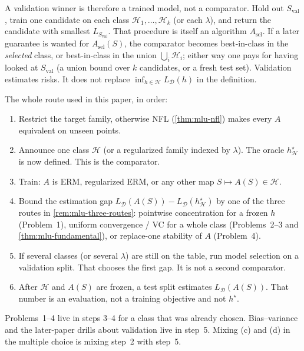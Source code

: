 \begin{remark}
A validation winner is therefore a trained model, not a comparator. Hold out $S_{\mathrm{val}}$, train one candidate on each class $\mathcal{H}_1,\dots,\mathcal{H}_k$ (or each $\lambda$), and return the candidate with smallest $L_{S_{\mathrm{val}}}$. That procedure is itself an algorithm $A_{\mathrm{sel}}$. If a later guarantee is wanted for $A_{\mathrm{sel}}(S)$, the comparator becomes best-in-class in the \emph{selected} class, or best-in-class in the union $\bigcup_i\mathcal{H}_i$; either way one pays for having looked at $S_{\mathrm{val}}$ (a union bound over $k$ candidates, or a fresh test set). Validation estimates risks. It does not replace $\inf_{h\in\mathcal{H}}L_{\mathcal{D}}(h)$ in the definition.

The whole route used in this paper, in order:
\begin{enumerate}
    \item Restrict the target family, otherwise NFL (\cref{thm:mlu-nfl}) makes every $A$ equivalent on unseen points.
    \item Announce one class $\mathcal{H}$ (or a regularized family indexed by $\lambda$). The oracle $h^\star_{\mathcal{H}}$ is now defined. This is the comparator.
    \item Train: $A$ is ERM, regularized ERM, or any other map $S\mapsto A(S)\in\mathcal{H}$.
    \item Bound the estimation gap $L_{\mathcal{D}}(A(S))-L_{\mathcal{D}}(h^\star_{\mathcal{H}})$ by one of the three routes in \cref{rem:mlu-three-routes}: pointwise concentration for a frozen $h$ (Problem~1), uniform convergence / VC for a whole class (Problems~2--3 and \cref{thm:mlu-fundamental}), or replace-one stability of $A$ (Problem~4).
    \item If several classes (or several $\lambda$) are still on the table, run model selection on a validation split. That chooses the first gap. It is not a second comparator.
    \item After $\mathcal{H}$ and $A(S)$ are frozen, a test split estimates $L_{\mathcal{D}}(A(S))$. That number is an evaluation, not a training objective and not $h^\star$.
\end{enumerate}
Problems~1--4 live in steps 3--4 for a class that was already chosen. Bias--variance and the later-paper drills about validation live in step~5. Mixing (c) and (d) in the multiple choice is mixing step~2 with step~5.
\end{remark}

